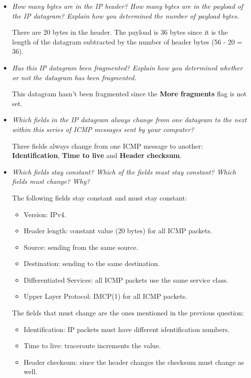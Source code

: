 \documentclass[11pt]{article}
\begin{document}
\begin{itemize}
	\item
		\textit{How many bytes are in the IP header? How many bytes are in the payload of the IP
datagram? Explain how you determined the number of payload bytes.}
		\par There are 20 bytes in the header. The payload is 36 bytes since it is the length of the datagram subtracted by the number of header bytes  (56 - 20 = 36).
		
	\item
		\textit{Has this IP datagram been fragmented? Explain how you determined whether or not the
datagram has been fragmented.}
		\par This datagram hasn't been fragmented since the \textbf{More fragments} flag is not set.
		
	\item
		\textit{Which fields in the IP datagram always change from one datagram to the next within this series of ICMP messages sent by your computer?}
		\par Three fields always change from one ICMP message to another: \textbf{Identification}, \textbf{Time to live} and \textbf{Header checksum}.
		
	\item
		\textit{Which fields stay constant? Which of the fields must stay constant? Which fields must change? Why?}
		\par The following fields stay constant and must stay constant:
		\begin{itemize}
			\item Version: IPv4.
			\item Header length: constant value (20 bytes) for all ICMP packets.
			\item Source: sending from the same source.
			\item Destination: sending to the same destination.
			\item Differentiated Services: all ICMP packets use the same service class.
			\item Upper Layer Protocol: IMCP(1) for all ICMP packets.
		\end{itemize}
		
		\par The fields that must change are the ones mentioned in the previous question:
		\begin{itemize}
			\item Identification: IP packets must have different identification numbers.
			\item Time to live: traceroute increments the value.
			\item Header checksum: since the header changes the checksum must change as well.
		\end{itemize}
		

\end{itemize}
\end{document}
